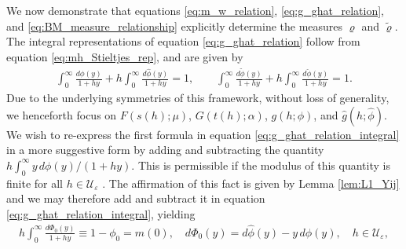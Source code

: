 \documentclass[english,12pt,jmp,graphicx]{revtex4-1}
\newcommand{\ph}{\hat{\phi}}
\newcommand{\pt}{\tilde{\phi}}
\newcommand{\pc}{\check{\phi}}
\begin{document}
We now demonstrate that equations \eqref{eq:m_w_relation},
\eqref{eq:g_ghat_relation}, and \eqref{eq:BM_measure_relationship}
explicitly determine the measures $\varrho$ and $\tilde{\varrho}$. The integral
representations of equation \eqref{eq:g_ghat_relation} follow from
equation \eqref{eq:mh_Stieltjes_rep}, and are given by  
%
\begin{align}\label{eq:g_ghat_relation_integral}
  \int_0^\infty\frac{d\phi(y)}{1+hy}+h\int_0^\infty\frac{d\ph(y)}{1+hy}=1,\qquad
  \int_0^\infty\frac{d\pt(y)}{1+hy}+h\int_0^\infty\frac{d\pc(y)}{1+hy}=1.
\end{align}
%
Due to the underlying symmetries of this framework, without loss of
generality, we henceforth focus on $F(s(h);\mu)$, $G(t(h);\alpha)$, $g(h;\phi)$,
and $\hat{g}(h;\ph)$. We wish to re-express the first formula in
equation \eqref{eq:g_ghat_relation_integral} in a more suggestive form
by adding and subtracting the quantity $h\int_0^\infty y\,d\phi(y)/(1+hy)$. This
is permissible if the modulus of this quantity is finite for all
$h\in\mathcal{U}_\varepsilon$ \cite{Rudin:87,Folland:99}. The affirmation of this
fact is given by Lemma \ref{lem:L1_Yij} and we may therefore add and
subtract it in equation \eqref{eq:g_ghat_relation_integral}, yielding    
%
%
\begin{align}\label{eq:n=0_measure_equivalence}
 h \int_0^\infty\frac{d\Phi_0(y)}{1+hy}\equiv1-\phi_0=m(0),  \quad
 d\Phi_0(y)=d\ph(y)-y\,d\phi(y), \quad
 h\in\mathcal{U}_\varepsilon,
\end{align}
\end{document}
